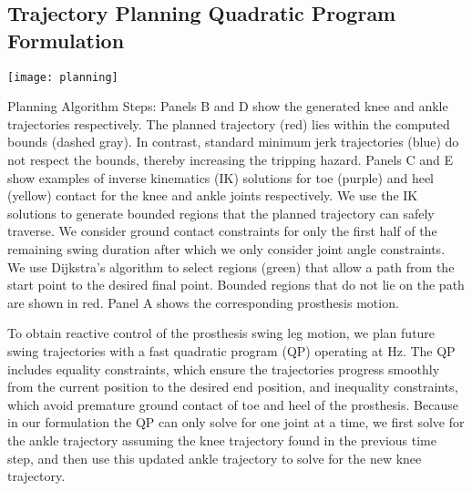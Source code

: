 \subsection{Trajectory Planning Quadratic Program Formulation}
\label{sec:traj_plan}

\begin{pagefigure}
    \texttt{[image: planning]}
    \caption[Planning Algorithm Steps]{Planning Algorithm Steps: Panels B and D
    show the generated knee and ankle trajectories respectively.  The planned
    trajectory (red) lies within the computed bounds (dashed gray).  In
    contrast, standard minimum jerk trajectories (blue) do not respect the
    bounds, thereby increasing the tripping hazard. Panels C and E show examples
    of inverse kinematics (IK) solutions for toe (purple) and heel (yellow)
    contact for the knee and ankle joints respectively. We use the IK solutions
    to generate bounded regions that the planned trajectory can safely traverse.
    We consider ground contact constraints for only the first half of the
    remaining swing duration after which we only consider joint angle
    constraints. We use Dijkstra's algorithm to select regions (green) that
    allow a path from the start point to the desired final point. Bounded
    regions that do not lie on the path are shown in red. Panel A shows the
    corresponding prosthesis motion.}\label{fig:planning}
\end{pagefigure}

To obtain reactive control of the prosthesis swing leg motion, we plan future
swing trajectories with a fast quadratic program (QP) operating at
\unit[100]{Hz}. The QP includes equality constraints, which ensure the
trajectories progress smoothly from the current position to the desired end
position, and inequality constraints, which avoid premature ground contact of
toe and heel of the prosthesis. Because in our formulation the QP can only solve
for one joint at a time, we first solve for the ankle trajectory assuming the
knee trajectory found in the previous time step, and then use this updated ankle
trajectory to solve for the new knee trajectory.

